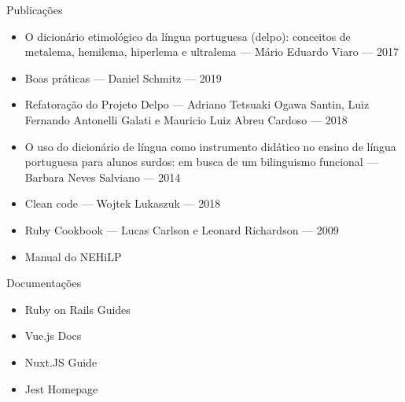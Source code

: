 \documentclass[aspectratio=43,display]{beamer}
\begin{document}
  \begin{frame}{Publicações}
    \begin{itemize}
      \item O dicionário etimológico da língua portuguesa (delpo): conceitos de metalema, hemilema, hiperlema e
      ultralema --- Mário Eduardo Viaro --- 2017
      \item Boas práticas --- Daniel Schmitz --- 2019
      \item Refatoração do Projeto Delpo --- Adriano Tetsuaki Ogawa Santin, Luiz Fernando Antonelli Galati e
      Mauricio Luiz Abreu Cardoso --- 2018
      \item O uso do dicionário de língua como instrumento didático no ensino de língua portuguesa para alunos
      surdos: em busca de um bilinguismo funcional --- Barbara Neves Salviano --- 2014
      \item Clean code --- Wojtek Lukaszuk --- 2018
      \item Ruby Cookbook --- Lucas Carlson e Leonard Richardson --- 2009
      \item Manual do NEHiLP
    \end{itemize}
  \end{frame}

  \begin{frame}{Documentações}
    \begin{itemize}
      \item Ruby on Rails Guides
      \item Vue.js Docs
      \item Nuxt.JS Guide
      \item Jest Homepage
    \end{itemize}
  \end{frame}
\end{document}
